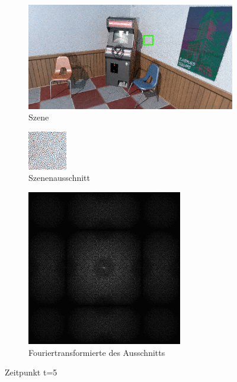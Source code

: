 \begin{figure}[H]
    \begin{subfigure}{\textwidth}   
        \centering \includegraphics[scale=.25]{content/TemporalerAlg/Bilder/Retargeting/Szene/Szene5.png}
        \caption{Szene}
        \label{fig:Retargeting_And_Sorting_Szene_t5}
    \end{subfigure}
    \begin{subfigure}{0.5\textwidth}
        \centering\includegraphics[width=0.4\linewidth]{content/TemporalerAlg/Bilder/Retargeting/Ausschnitt/Ausschnitt5.png} 
        \caption{Szenenausschnitt}
        \label{fig:Retargeting_And_Sorting_ausschnitt_t5}
    \end{subfigure}
    \begin{subfigure}{0.5\textwidth}
        \centering\includegraphics[width=0.4\linewidth]{content/TemporalerAlg/Bilder/Retargeting/Spektren/Ausschnitt5.png}
        \caption{Fouriertransformierte des Ausschnitts}
        \label{fig:Retargeting_And_Sorting_Fouriertransformierte_t5}
    \end{subfigure}
        \caption{Zeitpunkt t=5}
        \label{fig:Retargeting_And_Sorting_Verlauf_t5}
\end{figure}

